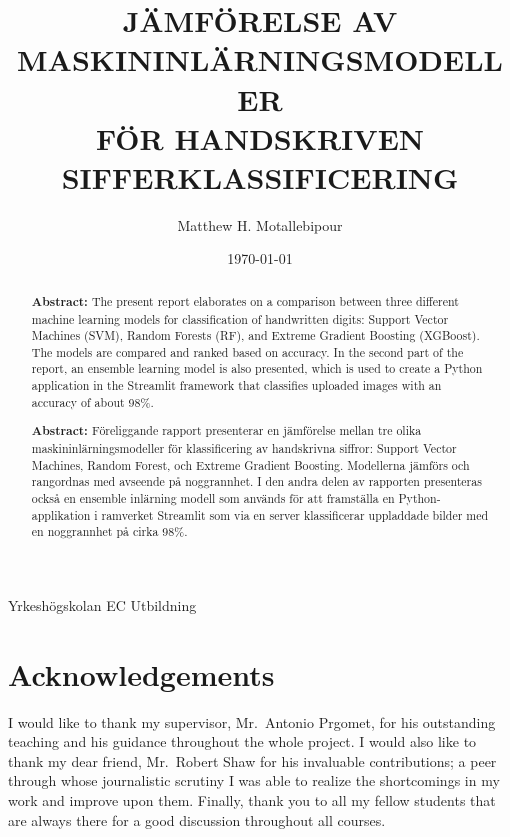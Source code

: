 \documentclass[12pt,a4paper]{article}
\title{\Huge{JÄMFÖRELSE AV\\MASKININLÄRNINGSMODELLER\\
FÖR HANDSKRIVEN SIFFERKLASSIFICERING}}
\author{Matthew H. Motallebipour}
\date{\today}
\newcommand{\institute}[1]{%
  \begin{center}
    \large{#1}
  \end{center}
}
\begin{document}
\maketitle
\institute{Yrkeshögskolan EC Utbildning}

\newpage

\begin{abstract}
    \noindent
    \textbf{Abstract:} The present report elaborates on a comparison between three different machine learning models for classification of handwritten digits: Support Vector Machines (SVM), Random Forests (RF), and Extreme Gradient Boosting (XGBoost). The models are compared and ranked based on accuracy. In the second part of the report, an ensemble learning model is also presented, which is used to create a Python application in the Streamlit framework that classifies uploaded images with an accuracy of about 98\%.
  \end{abstract}
  
\newpage

\begin{abstract}
    \noindent
    \textbf{Abstract:} Föreliggande rapport presenterar en jämförelse mellan tre olika maskininlärningsmodeller för klassificering av handskrivna siffror: Support Vector Machines, Random Forest, och Extreme Gradient Boosting. Modellerna jämförs och rangordnas med avseende på noggrannhet. I den andra delen av rapporten presenteras också en ensemble inlärning modell som används för att framställa en Python-applikation i ramverket Streamlit som via en server klassificerar uppladdade bilder med en noggrannhet på cirka 98\%.
  \end{abstract}

\newpage

\section*{Acknowledgements}
I would like to thank my supervisor, Mr.~Antonio Prgomet, for his outstanding teaching and his guidance throughout the whole project. I would also like to thank my dear friend, Mr.~Robert Shaw for his invaluable contributions; a peer through whose journalistic scrutiny I was able to realize the shortcomings in my work and improve upon them. Finally, thank you to all my fellow students that are always there for a good discussion throughout all courses.

\newpage

\end{document}
